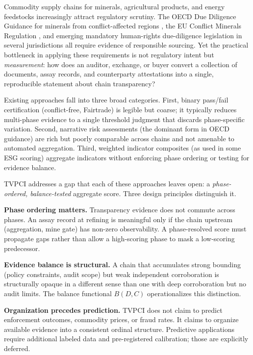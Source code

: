 \documentclass[12pt]{article}
\theoremstyle{remark}
\begin{document}
Commodity supply chains for minerals, agricultural products, and energy feedstocks
increasingly attract regulatory scrutiny.  The OECD Due Diligence Guidance for minerals
from conflict-affected regions \cite{OECD2016}, the EU Conflict Minerals Regulation
\cite{EU2017}, and emerging mandatory human-rights due-diligence legislation in several
jurisdictions all require evidence of responsible sourcing.  Yet the practical bottleneck
in applying these requirements is not regulatory intent but \emph{measurement}: how does
an auditor, exchange, or buyer convert a collection of documents, assay records, and
counterparty attestations into a single, reproducible statement about chain transparency?

Existing approaches fall into three broad categories.  First, binary pass/fail
certification (conflict-free, Fairtrade) is legible but coarse; it typically reduces
multi-phase evidence to a single threshold judgment that discards phase-specific variation.
Second, narrative risk assessments (the dominant form in OECD guidance) are rich but
poorly comparable across chains and not amenable to automated aggregation.  Third, weighted
indicator composites (as used in some ESG scoring) aggregate indicators without enforcing
phase ordering or testing for evidence balance.

TVPCI addresses a gap that each of these approaches leaves open: a
\emph{phase-ordered, balance-tested} aggregate score.  Three design principles distinguish it.

\textbf{Phase ordering matters.}  Transparency evidence does not commute across phases.  An
assay record at refining is meaningful only if the chain upstream (aggregation, mine gate)
has non-zero observability.  A phase-resolved score must propagate gaps rather than allow
a high-scoring phase to mask a low-scoring predecessor.

\textbf{Evidence balance is structural.}  A chain that accumulates strong bounding (policy
constraints, audit scope) but weak independent corroboration is structurally opaque in a
different sense than one with deep corroboration but no audit limits.  The balance
functional $B(D,C)$ operationalizes this distinction.

\textbf{Organization precedes prediction.}  TVPCI does not claim to predict enforcement
outcomes, commodity prices, or fraud rates.  It claims to organize available evidence into
a consistent ordinal structure.  Predictive applications require additional labeled data
and pre-registered calibration; those are explicitly deferred.
\end{document}
